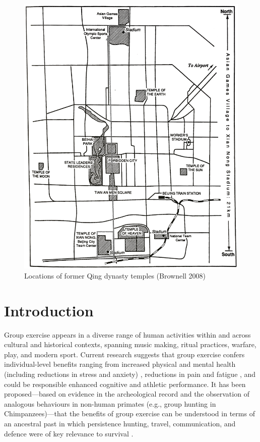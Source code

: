 \begin{figure}[htbp]
  \includegraphics[width = \linewidth]{images/beijingTemplesXNT.png}
  \caption{Locations of former Qing dynasty temples (Brownell 2008)}
  \label{fig:beijingTemplesXNT}
\end{figure}


\section{Introduction}
Group exercise appears in a diverse range of human activities within and across cultural and historical contexts, spanning music making, ritual practices, warfare, play, and modern sport.  Current research suggests that group exercise confers individual-level benefits ranging from increased physical and mental health (including reductions in stress and anxiety) \citep{}, reductions in pain and fatigue \citep{Cohen2009,Davis2018}, and could be responsible enhanced cognitive \citep{} and athletic \citep{Davis2015} performance.  It has been proposed---based on evidence in the archeological record and the observation of analogous behaviours in non-human primates (e.g., group hunting in Chimpanzees)---that the benefits of group exercise can be understood in terms of an ancestral past in which persistence hunting, travel, communication, and defence were of key relevance to survival \citep{Sands2010}.

